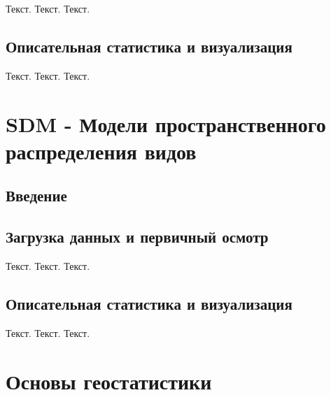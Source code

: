 \documentclass[
  letterpaper,
  DIV=11,
  numbers=noendperiod]{scrreprt}
\begin{document}
Текст. Текст. Текст.

\section{Описательная статистика и
визуализация}\label{ux43eux43fux438ux441ux430ux442ux435ux43bux44cux43dux430ux44f-ux441ux442ux430ux442ux438ux441ux442ux438ux43aux430-ux438-ux432ux438ux437ux443ux430ux43bux438ux437ux430ux446ux438ux44f-1}

Текст. Текст. Текст.


\chapter{SDM - Модели пространственного распределения
видов}\label{sdm---ux43cux43eux434ux435ux43bux438-ux43fux440ux43eux441ux442ux440ux430ux43dux441ux442ux432ux435ux43dux43dux43eux433ux43e-ux440ux430ux441ux43fux440ux435ux434ux435ux43bux435ux43dux438ux44f-ux432ux438ux434ux43eux432}

\section{Введение}\label{ux432ux432ux435ux434ux435ux43dux438ux435-3}

\section{Загрузка данных и первичный
осмотр}\label{ux437ux430ux433ux440ux443ux437ux43aux430-ux434ux430ux43dux43dux44bux445-ux438-ux43fux435ux440ux432ux438ux447ux43dux44bux439-ux43eux441ux43cux43eux442ux440-2}

Текст. Текст. Текст.

\section{Описательная статистика и
визуализация}\label{ux43eux43fux438ux441ux430ux442ux435ux43bux44cux43dux430ux44f-ux441ux442ux430ux442ux438ux441ux442ux438ux43aux430-ux438-ux432ux438ux437ux443ux430ux43bux438ux437ux430ux446ux438ux44f-2}

Текст. Текст. Текст.


\chapter{Основы
геостатистики}\label{ux43eux441ux43dux43eux432ux44b-ux433ux435ux43eux441ux442ux430ux442ux438ux441ux442ux438ux43aux438}
\end{document}
